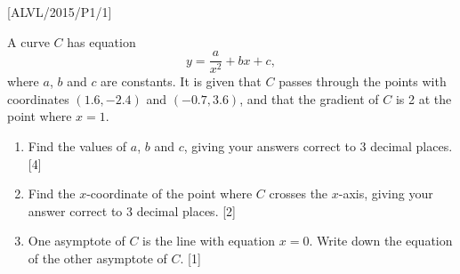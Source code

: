 \item {[}ALVL/2015/P1/1{]}

A curve $C$ has equation 
\[
y=\frac{a}{x^{2}}+bx+c,
\]
where $a$, $b$ and $c$ are constants. It is given that $C$ passes
through the points with coordinates $\left(1.6,-2.4\right)$ and $\left(-0.7,3.6\right)$,
and that the gradient of $C$ is 2 at the point where $x=1$. 
\begin{enumerate}
\item Find the values of $a$, $b$ and $c$, giving your answers correct
to 3 decimal places.\hfill{} {[}4{]}
\item Find the $x$-coordinate of the point where $C$ crosses the $x$-axis,
giving your answer correct to 3 decimal places. \hfill{}{[}2{]}
\item One asymptote of $C$ is the line with equation $x=0$. Write down
the equation of the other asymptote of $C$. \hfill{}{[}1{]}
\end{enumerate}
